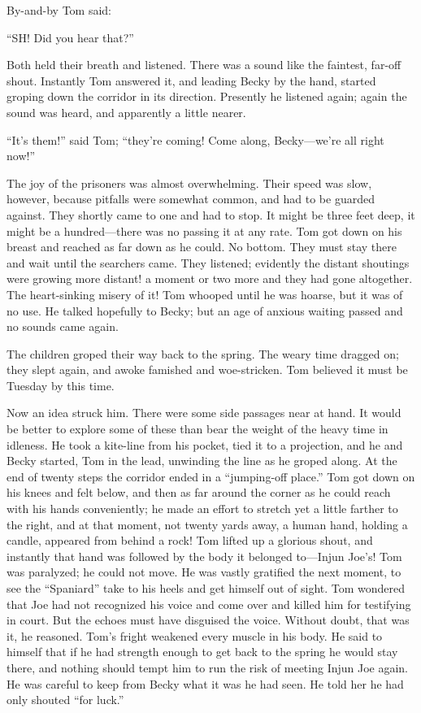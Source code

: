\documentclass{book}
\begin{document}
By-and-by Tom said:

“SH! Did you hear that?”

Both held their breath and listened. There was a sound like the faintest, far-off shout. Instantly Tom answered it, and leading Becky by the hand, started groping down the corridor in its direction. Presently he listened again; again the sound was heard, and apparently a little nearer.

“It’s them!” said Tom; “they’re coming! Come along, Becky—we’re all right now!”

The joy of the prisoners was almost overwhelming. Their speed was slow, however, because pitfalls were somewhat common, and had to be guarded against. They shortly came to one and had to stop. It might be three feet deep, it might be a hundred—there was no passing it at any rate. Tom got down on his breast and reached as far down as he could. No bottom. They must stay there and wait until the searchers came. They listened; evidently the distant shoutings were growing more distant! a moment or two more and they had gone altogether. The heart-sinking misery of it! Tom whooped until he was hoarse, but it was of no use. He talked hopefully to Becky; but an age of anxious waiting passed and no sounds came again.

The children groped their way back to the spring. The weary time dragged on; they slept again, and awoke famished and woe-stricken. Tom believed it must be Tuesday by this time.

Now an idea struck him. There were some side passages near at hand. It would be better to explore some of these than bear the weight of the heavy time in idleness. He took a kite-line from his pocket, tied it to a projection, and he and Becky started, Tom in the lead, unwinding the line as he groped along. At the end of twenty steps the corridor ended in a “jumping-off place.” Tom got down on his knees and felt below, and then as far around the corner as he could reach with his hands conveniently; he made an effort to stretch yet a little farther to the right, and at that moment, not twenty yards away, a human hand, holding a candle, appeared from behind a rock! Tom lifted up a glorious shout, and instantly that hand was followed by the body it belonged to—Injun Joe’s! Tom was paralyzed; he could not move. He was vastly gratified the next moment, to see the “Spaniard” take to his heels and get himself out of sight. Tom wondered that Joe had not recognized his voice and come over and killed him for testifying in court. But the echoes must have disguised the voice. Without doubt, that was it, he reasoned. Tom’s fright weakened every muscle in his body. He said to himself that if he had strength enough to get back to the spring he would stay there, and nothing should tempt him to run the risk of meeting Injun Joe again. He was careful to keep from Becky what it was he had seen. He told her he had only shouted “for luck.”
\end{document}
